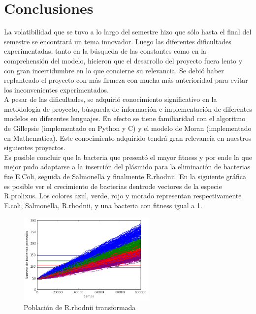 \documentclass[12pt]{article}
\numberwithin{equation}{section}
\begin{document}
\section{Conclusiones}

	La volatibilidad que se tuvo a lo largo del semestre hizo que sólo hasta el final del semestre se encontrará un tema innovador. Luego las diferentes dificultades experimentadas, tanto en la búsqueda de las constantes como en la comprehensión del modelo, hicieron que el desarrollo del proyecto fuera lento y con gran incertidumbre en lo que concierne su relevancia. Se debió haber replanteado el proyecto con más firmeza con mucha más anterioridad para evitar los inconvenientes experimentados.\\

A pesar de las dificultades, se adquirió conocimiento significativo en la metodología de proyecto, búsqueda de información e implementación de diferentes modelos en diferentes lenguajes. En efecto se tiene familiaridad con el algoritmo de Gillepsie (implementado en Python y C) y el modelo de Moran (implementado en Mathematica). Este conocimiento adquirido tendrá gran relevancia en nuestros siguientes proyectos.\\

Es posible concluir que la bacteria que presentó el mayor fitness y por ende la que mejor pudo adaptarse a la inserción del plásmido para la eliminación de bacterias fue E.Coli, seguida de Salmonella y finalmente R.rhodnii. En la siguiente gráfica es posible ver el crecimiento de bacterias dentrode vectores de la especie R.prolixus. Los colores azul, verde, rojo y morado representan respectivamente E.coli, Salmonella, R.rhodnii, y una bacteria con fitness igual a 1.\\


\begin{figure}[!ht]
\includegraphics[width=0.6\textwidth]{todasLasCorridas.png}
\caption{Población de R.rhodnii transformada}
\FloatBarrier
\end{figure}
\FloatBarrier
\end{document}
